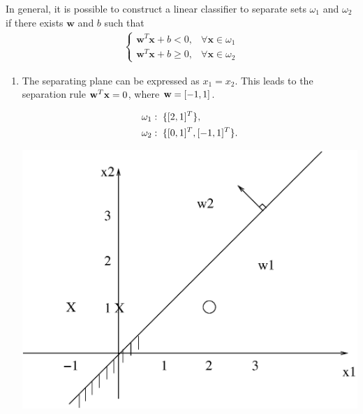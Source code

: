 \begin{enumerate}
  \begin{solution}

    In general, it is possible to construct a linear classifier to
    separate sets $\omega_1$ and $\omega_2$ if there exists
    $\mathbf{w}$ and $b$ such that
    \begin{align*}
      \begin{cases}
        \mathbf{w}^T\mathbf{x}+b<0, & \forall \mathbf{x} \in \omega_1
        \\
        \mathbf{w}^T\mathbf{x}+b\geq 0, & \forall \mathbf{x} \in \omega_2
      \end{cases}
    \end{align*}

    \begin{enumerate} 
    \item

      The separating plane can be expressed as $x_1 = x_2$. This leads to
      the separation rule ${\bf{w}}^T {\bf{x}}=0$, where ${\bf{w}}=[-1,1]$.
      
      \begin{align}
        &\omega_1: \text{\;} \{[2,1]^T\}, \notag \\
        &\omega_2: \text{\;} \{[0,1]^T, [-1,1]^T \}. \notag
      \end{align}
      \begin{center}
        \includegraphics[scale=0.35]{e4_5.eps}
      \end{center}


\end{enumerate}
\end{solution}
\end{enumerate}
